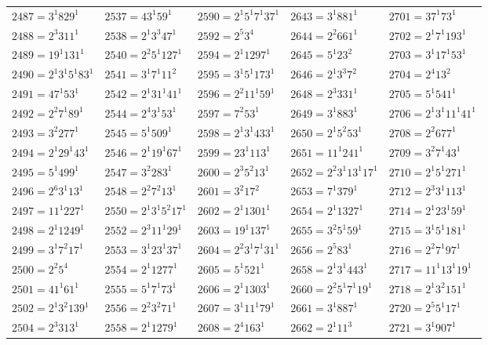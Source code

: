 {\begin{longtable}[c]{*{5}{l}}
$2487=3^{1}829^{1}$&$2537=43^{1}59^{1}$&$2590=2^{1}5^{1}7^{1}37^{1}$&$2643=3^{1}881^{1}$&$2701=37^{1}73^{1}$\\
$2488=2^{3}311^{1}$&$2538=2^{1}3^{3}47^{1}$&$2592=2^{5}3^{4}$&$2644=2^{2}661^{1}$&$2702=2^{1}7^{1}193^{1}$\\
$2489=19^{1}131^{1}$&$2540=2^{2}5^{1}127^{1}$&$2594=2^{1}1297^{1}$&$2645=5^{1}23^{2}$&$2703=3^{1}17^{1}53^{1}$\\
$2490=2^{1}3^{1}5^{1}83^{1}$&$2541=3^{1}7^{1}11^{2}$&$2595=3^{1}5^{1}173^{1}$&$2646=2^{1}3^{3}7^{2}$&$2704=2^{4}13^{2}$\\
$2491=47^{1}53^{1}$&$2542=2^{1}31^{1}41^{1}$&$2596=2^{2}11^{1}59^{1}$&$2648=2^{3}331^{1}$&$2705=5^{1}541^{1}$\\
$2492=2^{2}7^{1}89^{1}$&$2544=2^{4}3^{1}53^{1}$&$2597=7^{2}53^{1}$&$2649=3^{1}883^{1}$&$2706=2^{1}3^{1}11^{1}41^{1}$\\
$2493=3^{2}277^{1}$&$2545=5^{1}509^{1}$&$2598=2^{1}3^{1}433^{1}$&$2650=2^{1}5^{2}53^{1}$&$2708=2^{2}677^{1}$\\
$2494=2^{1}29^{1}43^{1}$&$2546=2^{1}19^{1}67^{1}$&$2599=23^{1}113^{1}$&$2651=11^{1}241^{1}$&$2709=3^{2}7^{1}43^{1}$\\
$2495=5^{1}499^{1}$&$2547=3^{2}283^{1}$&$2600=2^{3}5^{2}13^{1}$&$2652=2^{2}3^{1}13^{1}17^{1}$&$2710=2^{1}5^{1}271^{1}$\\
$2496=2^{6}3^{1}13^{1}$&$2548=2^{2}7^{2}13^{1}$&$2601=3^{2}17^{2}$&$2653=7^{1}379^{1}$&$2712=2^{3}3^{1}113^{1}$\\
$2497=11^{1}227^{1}$&$2550=2^{1}3^{1}5^{2}17^{1}$&$2602=2^{1}1301^{1}$&$2654=2^{1}1327^{1}$&$2714=2^{1}23^{1}59^{1}$\\
$2498=2^{1}1249^{1}$&$2552=2^{3}11^{1}29^{1}$&$2603=19^{1}137^{1}$&$2655=3^{2}5^{1}59^{1}$&$2715=3^{1}5^{1}181^{1}$\\
$2499=3^{1}7^{2}17^{1}$&$2553=3^{1}23^{1}37^{1}$&$2604=2^{2}3^{1}7^{1}31^{1}$&$2656=2^{5}83^{1}$&$2716=2^{2}7^{1}97^{1}$\\
$2500=2^{2}5^{4}$&$2554=2^{1}1277^{1}$&$2605=5^{1}521^{1}$&$2658=2^{1}3^{1}443^{1}$&$2717=11^{1}13^{1}19^{1}$\\
$2501=41^{1}61^{1}$&$2555=5^{1}7^{1}73^{1}$&$2606=2^{1}1303^{1}$&$2660=2^{2}5^{1}7^{1}19^{1}$&$2718=2^{1}3^{2}151^{1}$\\
$2502=2^{1}3^{2}139^{1}$&$2556=2^{2}3^{2}71^{1}$&$2607=3^{1}11^{1}79^{1}$&$2661=3^{1}887^{1}$&$2720=2^{5}5^{1}17^{1}$\\
$2504=2^{3}313^{1}$&$2558=2^{1}1279^{1}$&$2608=2^{4}163^{1}$&$2662=2^{1}11^{3}$&$2721=3^{1}907^{1}$\\

\end{longtable}}
